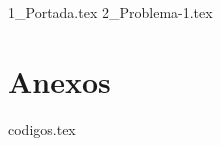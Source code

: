 \documentclass[a4paper,12pt,twoside]{all-in-one} %
\begin{document}

{1_Portada.tex}
{
  \hypersetup{hidelinks}
  \tableofcontents
}
\clearpage
{2_Problema-1.tex}
\FloatBarrier 

\clearpage
\appendix
\section*{Anexos} 
{codigos.tex}

\pagestyle{\auxsettings}
\printbibliography[heading=bibintoc]
\end{document}
